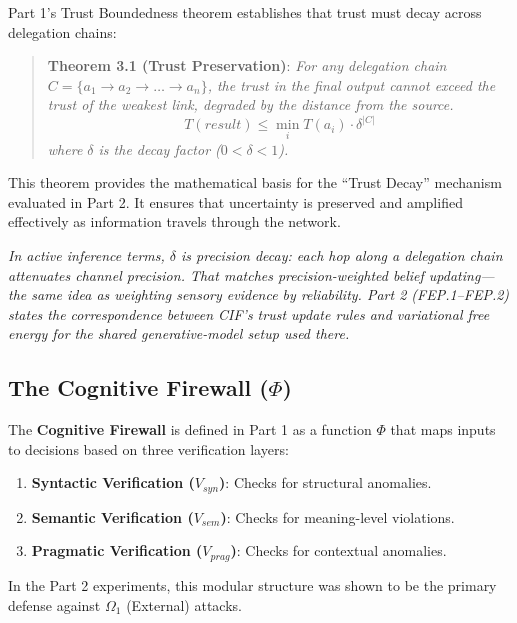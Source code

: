 \documentclass[
]{article}
\providecommand{\tightlist}{%
  \setlength{\itemsep}{0pt}\setlength{\parskip}{0pt}}
\begin{document}
Part 1's Trust Boundedness theorem establishes that trust must decay
across delegation chains:

\begin{quote}
\textbf{Theorem 3.1 (Trust Preservation)}: \emph{For any delegation
chain \(C = \{a_1 \to a_2 \to \dots \to a_n\}\), the trust in the final
output cannot exceed the trust of the weakest link, degraded by the
distance from the source.}
\[ T(result) \le \min_{i} T(a_i) \cdot \delta^{\lvert C\rvert} \]
\emph{where \(\delta\) is the decay factor (\(0 < \delta < 1\)).}
\end{quote}

This theorem provides the mathematical basis for the ``Trust Decay''
mechanism evaluated in Part 2. It ensures that uncertainty is preserved
and amplified effectively as information travels through the network.

\emph{In active inference terms, \(\delta\) is precision decay: each hop
along a delegation chain attenuates channel precision. That matches
precision-weighted belief updating---the same idea as weighting sensory
evidence by reliability. Part 2 (FEP.1--FEP.2) states the correspondence
between CIF's trust update rules and variational free energy for the
shared generative-model setup used there.}

\subsection{\texorpdfstring{The Cognitive Firewall
(\(\Phi\))}{The Cognitive Firewall (Phi)}}\label{sec:firewall-review}

The \textbf{Cognitive Firewall} is defined in Part 1 as a function
\(\Phi\) that maps inputs to decisions based on three verification
layers:

\begin{enumerate}
\def\labelenumi{\arabic{enumi}.}
\tightlist
\item
  \textbf{Syntactic Verification (\(V_{syn}\))}: Checks for structural
  anomalies.
\item
  \textbf{Semantic Verification (\(V_{sem}\))}: Checks for meaning-level
  violations.
\item
  \textbf{Pragmatic Verification (\(V_{prag}\))}: Checks for contextual
  anomalies.
\end{enumerate}

In the Part 2 experiments, this modular structure was shown to be the
primary defense against \(\Omega_1\) (External) attacks.
\end{document}
